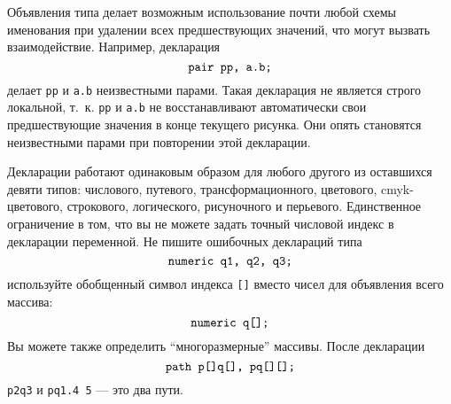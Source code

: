 \documentclass{article} %
\begin{document}
Объявления типа 
делает возможным использование почти любой схемы именования при 
удалении всех предшествующих значений, что могут вызвать 
взаимодействие.
Например, декларация 
$$ \hbox{\tt pair pp, a.b;} $$
делает {\tt pp} и {\tt a.b} неизвестными парами.
Такая декларация не является строго локальной, т.~к. {\tt pp} и {\tt a.b} 
не восстанавливают автоматически свои предшествующие значения в конце 
текущего рисунка.
Они опять становятся неизвестными парами при повторении этой декларации.

Декларации работают одинаковым образом для любого другого из оставшихся 
девяти типов:  числового, путевого, трансформационного, цветового, 
cmyk-цветового, строкового, логического, рисуночного и перьевого.
Единственное ограничение в том, что вы не можете задать точный числовой 
индекс в декларации переменной.
Не пишите ошибочных деклараций типа
$$ \hbox{\tt numeric q1, q2, q3;} $$
используйте обобщенный символ индекса 
{\tt []}
вместо чисел для объявления всего массива:
$$ \hbox{\tt numeric q[];} $$
Вы можете также определить ``многоразмерные'' 
массивы.
После декларации 
$$ \hbox{\tt path p[]q[], pq[][];} $$
{\tt p2q3} и {\tt pq1.4 5} --- это два пути.
\end{document}
